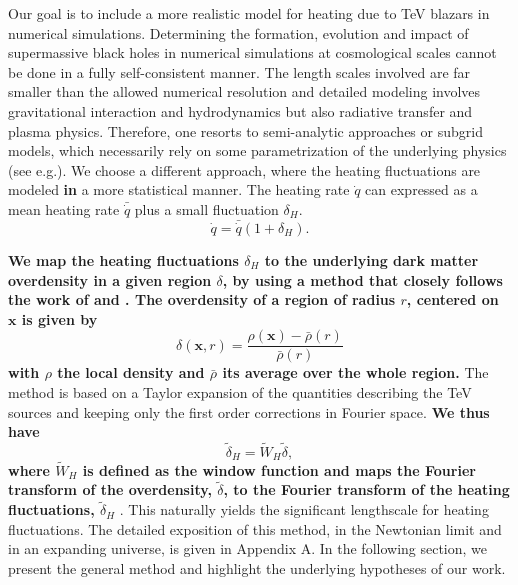 \documentclass[twocolumns]{emulateapj}
\newcommand\ALc[1]{{\color{red} \bf #1}} %
\newcommand\Pc[1]{{\color{cyan} \bf #1}} %
\begin{document}
Our goal is to include a more realistic model for heating due to TeV blazars in numerical simulations. Determining the formation, evolution and impact of supermassive black holes in numerical simulations at cosmological scales cannot be done in a fully self-consistent manner. The length scales involved are far smaller than the allowed numerical resolution and detailed modeling involves gravitational interaction and hydrodynamics but also radiative transfer and plasma physics. Therefore, one resorts to semi-analytic approaches or subgrid models, which necessarily rely on some parametrization of the underlying physics (see e.g.\citet{2007MNRAS.380..877S}). 
We choose a different approach, where the heating fluctuations are modeled \ALc{in} a more statistical manner. The heating rate $\dot{q}$ can expressed as a mean heating rate $\bar{\dot{q}}$ plus a small fluctuation $\delta_H$.
\begin{equation}
  \label{eq:delta_h}
  \dot{q}=\bar{\dot{q}}(1+\delta_H).
\end{equation}

\ALc{We map the heating fluctuations $\delta_H$ to the underlying dark matter overdensity in a given region $\delta$, by using a method that closely follows the work of  \citet{2007MNRAS.376.1680P} and \citet{2005ApJ...626....1B} . The overdensity of a region of radius $r$, centered on $\mathbf{x}$ is given by
\begin{equation}
  \label{eq:delta}
  \delta(\mathbf{x},r)=\frac{\rho(\mathbf{x})-\bar{\rho}(r)}{\bar{\rho}(r)}
\end{equation}
with $\rho$ the local density and $\bar{\rho}$ its average over the whole region.} The method is based on a Taylor expansion of the quantities describing the TeV sources and keeping only the first order corrections in Fourier space.  \ALc{We thus have}
\begin{equation}
  \label{eq:use_window}
  \tilde{\delta}_H=\tilde{W}_H\tilde{\delta},
\end{equation}
\Pc{where $\tilde{W}_H$ is defined as the window function and maps the Fourier transform of the overdensity, $\tilde{\delta}$, to the Fourier transform of the heating fluctuations, $\tilde{\delta}_H$ }. This naturally yields the significant lengthscale for heating fluctuations. %
The detailed exposition of this method, in the Newtonian limit and in an expanding universe, is given in Appendix A. In the following section, we present the general method and highlight the underlying hypotheses of our work.
\end{document}

